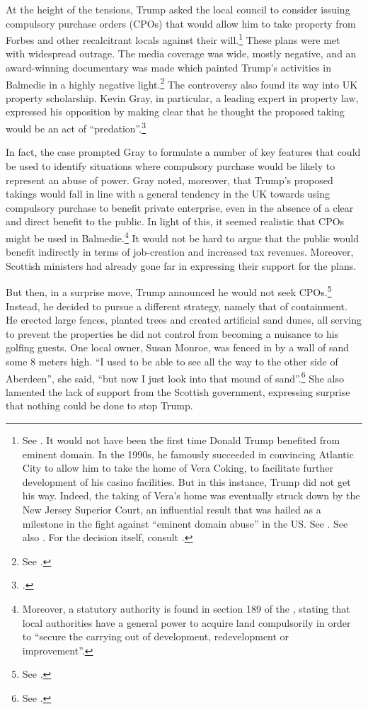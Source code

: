 At the height of the tensions, Trump asked the local council to consider issuing compulsory purchase orders (CPOs) that would allow him to take property from Forbes and other recalcitrant locals against their will.\footnote{See \cite{macaskill09}. It would not have been the first time Donald Trump benefited from eminent domain. In the 1990s, he famously succeeded in convincing Atlantic City to allow him to take the home of Vera Coking, to facilitate further development of his casino facilities. But in this instance, Trump did not get his way. Indeed, the taking of Vera's home was eventually struck down by the New Jersey Superior Court, an influential result that was hailed as a milestone in the fight against ``eminent domain abuse'' in the US. See \cite[297-301]{jones00}. See also \cite{gillespie08}. For the decision itself, consult \cite{banin98}.} These plans were met with widespread outrage. The media coverage was wide, mostly negative, and an award-winning documentary was made which painted Trump's activities in Balmedie in a highly negative light.\footnote{See \cite{baxter11}.} The controversy also found its way into UK property scholarship. Kevin Gray, in particular, a leading expert in property law, expressed his opposition by making clear that he thought the proposed taking would be an act of ``predation''.\footcite{gray11}

In fact, the case prompted Gray to formulate a number of key features that could be used to identify situations where compulsory purchase would be likely to represent an abuse of power. Gray noted, moreover, that Trump's proposed takings would fall in line with a general tendency in the UK towards using compulsory purchase to benefit private enterprise, even in the absence of a clear and direct benefit to the public. In light of this, it seemed realistic that CPOs might be used in Balmedie.\footnote{Moreover, a statutory authority is found in section 189 of the \cite{tcpsa97}, stating that local authorities have a general power to acquire land compulsorily in order to ``secure the carrying out of development, redevelopment or improvement''.} It would not be hard to argue that the public would benefit indirectly in terms of job-creation and increased tax revenues. Moreover, Scottish ministers had already gone far in expressing their support for the plans.

But then, in a surprise move, Trump announced he would not seek CPOs.\footnote{See \cite{scotsman11}.} Instead, he decided to pursue a different strategy, namely that of containment. He erected large fences, planted trees and created artificial sand dunes, all serving to prevent the properties he did not control from becoming a nuisance to his golfing guests. One local owner, Susan Monroe, was fenced in by a wall of sand some 8 meters high. ``I used to be able to see all the way to the other side of Aberdeen'', she said, ``but now I just look into that mound of sand''.\footnote{See \cite{booth12}.} She also lamented the lack of support from the Scottish government, expressing surprise that nothing could be done to stop Trump.

